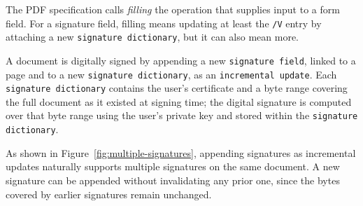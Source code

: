 \documentclass[12pt]{article}
\begin{document}
The PDF specification calls \emph{filling} the operation that supplies input to a form field. For a signature field, filling means updating at least the \texttt{/V} entry by attaching a new \texttt{signature dictionary}, but it can also mean more.




A document is digitally signed by appending a new \texttt{signature field}, linked to a page and to a new \texttt{signature dictionary}, as an \texttt{incremental update}. Each \texttt{signature dictionary} contains the user's certificate and a byte range covering the full document as it existed at signing time; the digital signature is computed over that byte range using the user's private key and stored within the \texttt{signature dictionary}.

As shown in Figure~\ref{fig:multiple-signatures}, appending signatures as incremental updates naturally supports multiple signatures on the same document. A new signature can be appended without invalidating any prior one, since the bytes covered by earlier signatures remain unchanged.
\end{document}
